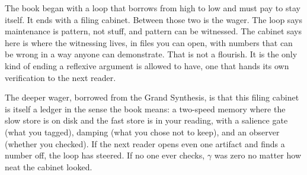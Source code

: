 The book began with a loop that borrows from high to low and must pay to stay itself. It ends with a filing cabinet. Between those two is the wager. The loop says maintenance is pattern, not stuff, and pattern can be witnessed. The cabinet says here is where the witnessing lives, in files you can open, with numbers that can be wrong in a way anyone can demonstrate. That is not a flourish. It is the only kind of ending a reflexive argument is allowed to have, one that hands its own verification to the next reader.

The deeper wager, borrowed from the Grand Synthesis, is that this filing cabinet is itself a ledger in the sense the book means: a two-speed memory where the slow store is on disk and the fast store is in your reading, with a salience gate (what you tagged), damping (what you chose not to keep), and an observer (whether you checked). If the next reader opens even one artifact and finds a number off, the loop has steered. If no one ever checks, $\gamma$ was zero no matter how neat the cabinet looked.

\clearpage

